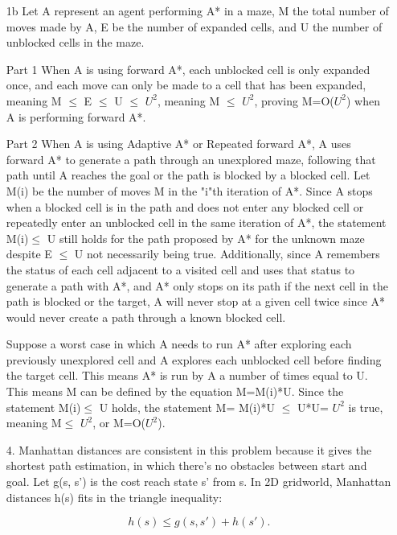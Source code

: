 \documentclass{article}
\begin{document}
\begin{enumerate}
\begin{enumerate}
            \item[1b] Let A represent an agent performing A* in a maze, M the total number of moves made by A, E be the number of expanded cells, and U the number of unblocked cells in the maze. 

            \item[Part 1] When A is using forward A*, each unblocked cell is only expanded once, and each move can only be made to a cell that has been expanded, meaning M $\le$ E $\le$ U $\le$ $U^2$, meaning M $\le$ $U^2$, proving M=O($U^2$) when A is performing forward A*.

            \item[Part 2] When A is using Adaptive A* or Repeated forward A*, A uses forward A* to generate a path through an unexplored maze, following that path until A reaches the goal or the path is blocked by a blocked cell. Let M(i) be the number of moves M in the "i"th iteration of A*. Since A stops when a blocked cell is in the path and does not enter any blocked cell or repeatedly enter an unblocked cell in the same iteration of A*, the statement M(i)$\le$ U still holds for the path proposed by A* for the unknown maze despite E $\le$ U not necessarily being true. Additionally, since A remembers the status of each cell adjacent to a visited cell and uses that status to generate a path with A*, and A* only stops on its path if the next cell in the path is blocked or the target, A will never stop at a given cell twice since A* would never create a path through a known blocked cell. 
            
            \item[] Suppose a worst case in which A needs to run A* after exploring each previously unexplored cell and A explores each unblocked cell before finding the target cell. This means A* is run by A a number of times equal to U. This means M can be defined by the equation M=M(i)*U. Since the statement  M(i)$\le$ U holds, the statement M= M(i)*U $\le$ U*U= $U^2$ is true, meaning M$\le$ $U^2$, or M=O($U^2$). 
            
            \item[4. ] Manhattan distances are consistent in this problem because it gives the shortest path estimation, in which there's no obstacles between start and goal.
            Let g(s, s') is the cost reach state s' from s. In 2D gridworld, Manhattan distances h(s) fits in the triangle inequality: 
            
            \[h(s) \leq g(s, s') + h(s'). \]
            

\end{enumerate}
\end{enumerate}
\end{document}
